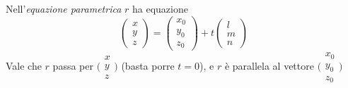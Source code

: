 Nell'\textit{equazione parametrica} $ r $ ha equazione \[
    \begin{pmatrix}
        x \\ y \\ z
    \end{pmatrix}=\begin{pmatrix}
        x_0 \\ y_0 \\ z_0
    \end{pmatrix} + t \begin{pmatrix}
        l \\ m \\ n
    \end{pmatrix}
\]
Vale che $ r $ passa per $ \bigl(\begin{smallmatrix}
    x \\ y \\ z
\end{smallmatrix}\bigr) $ (basta porre $ t=0 $), e $ r $ è parallela al vettore $ \bigl(\begin{smallmatrix}
    x_0 \\ y_0 \\ z_0
\end{smallmatrix}\bigr) $

